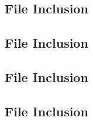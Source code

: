 \documentclass[11pt]{article}
\newcommand{\Verilog}[2][]{%
	
}
\begin{document}
\subsection*{File Inclusion}
\Verilog[caption=Full Adder Verilog code,label=code:file_ex]{fulladder.sv}

\subsection*{File Inclusion}
\Verilog[caption=Full Adder Test Benches Verilog code,label=code:file_ex]{fulladder_test.sv}

\subsection*{File Inclusion}
\Verilog[caption=Two Bit Adder/Aubtractor Verilog code,label=code:file_ex]{addsub.sv}

\subsection*{File Inclusion}
\Verilog[caption=Two Bit Adder/Aubtractor Test Benches Verilog code,label=code:file_ex]{addsub_test.sv}
\end{document}
